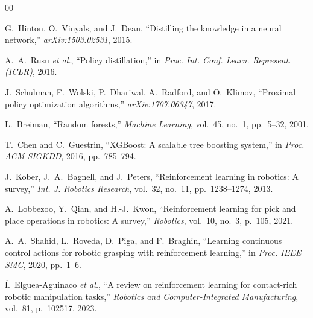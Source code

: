 \documentclass[conference]{IEEEtran}
\begin{document}
\begin{thebibliography}{00}

 G.~Hinton, O.~Vinyals, and J.~Dean, ``Distilling the knowledge
in a neural network,'' \emph{arXiv:1503.02531}, 2015.

 A.~A.~Rusu \emph{et al.}, ``Policy distillation,'' in
\emph{Proc. Int. Conf. Learn. Represent. (ICLR)}, 2016.

 J.~Schulman, F.~Wolski, P.~Dhariwal, A.~Radford, and
O.~Klimov, ``Proximal policy optimization algorithms,''
\emph{arXiv:1707.06347}, 2017.

 L.~Breiman, ``Random forests,'' \emph{Machine Learning},
vol.~45, no.~1, pp.~5--32, 2001.

 T.~Chen and C.~Guestrin, ``XGBoost: A scalable tree boosting
system,'' in \emph{Proc. ACM SIGKDD}, 2016, pp.~785--794.

 J.~Kober, J.~A.~Bagnell, and J.~Peters, ``Reinforcement learning
in robotics: A survey,'' \emph{Int. J. Robotics Research}, vol.~32, no.~11,
pp.~1238--1274, 2013.

 A.~Lobbezoo, Y.~Qian, and H.-J.~Kwon, ``Reinforcement
learning for pick and place operations in robotics: A survey,'' \emph{Robotics},
vol.~10, no.~3, p.~105, 2021.

 A.~A.~Shahid, L.~Roveda, D.~Piga, and F.~Braghin, ``Learning
continuous control actions for robotic grasping with reinforcement learning,'' in
\emph{Proc. IEEE SMC}, 2020, pp.~1--6.

 \'I.~Elguea-Aguinaco \emph{et al.}, ``A review on reinforcement
learning for contact-rich robotic manipulation tasks,'' \emph{Robotics and
Computer-Integrated Manufacturing}, vol.~81, p.~102517, 2023.

\end{thebibliography}
\end{document}
